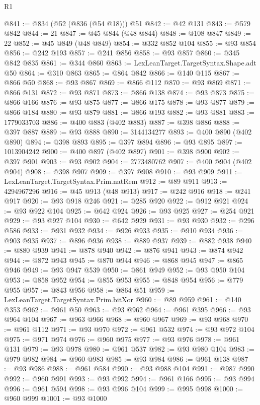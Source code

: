 \begin{lexlean}{R1}
\begin{coremodule}
@841 := @834 (@52 (@836 (@54 @18))) @51
@842 := @42 @131
@843 := @579 @842
@844 := 21
@847 := @45 @844 (@48 @844)
@848 := @108 @847
@849 := 22
@852 := @45 @849 (@48 @849)
@854 := @332 @852 @104
@855 := @93 @854
@856 := @242 @193
@857 := @241 @856
@858 := @93 @857
@860 := @345 @842 @835
@861 := @344 @860
@863 := LexLeanTarget.TargetSyntax.Shape.adt @50
@864 := @310 @863
@865 := @864 @842
@866 := @140 @115
@867 := @866 @50
@868 := @93 @867
@869 := @866 @112
@870 := @93 @869
@871 := @866 @131
@872 := @93 @871
@873 := @866 @138
@874 := @93 @873
@875 := @866 @166
@876 := @93 @875
@877 := @866 @175
@878 := @93 @877
@879 := @866 @184
@880 := @93 @879
@881 := @866 @193
@882 := @93 @881
@883 := 1779033703
@886 := @400 @883 (@402 @883)
@887 := @398 @886
@888 := @397 @887
@889 := @93 @888
@890 := 3144134277
@893 := @400 @890 (@402 @890)
@894 := @398 @893
@895 := @397 @894
@896 := @93 @895
@897 := 1013904242
@900 := @400 @897 (@402 @897)
@901 := @398 @900
@902 := @397 @901
@903 := @93 @902
@904 := 2773480762
@907 := @400 @904 (@402 @904)
@908 := @398 @907
@909 := @397 @908
@910 := @93 @909
@911 := LexLeanTarget.TargetSyntax.Prim.natRem
@912 := @89 @911
@913 := 4294967296
@916 := @45 @913 (@48 @913)
@917 := @242 @916
@918 := @241 @917
@920 := @93 @918 @246
@921 := @285 @920
@922 := @912 @921
@924 := @93 @922 @104
@925 := @642 @924
@926 := @93 @925
@927 := @254 @921
@929 := @93 @927 @104
@930 := @642 @929
@931 := @93 @930
@932 := @296 @586
@933 := @931 @932
@934 := @926 @933
@935 := @910 @934
@936 := @903 @935
@937 := @896 @936
@938 := @889 @937
@939 := @882 @938
@940 := @880 @939
@941 := @878 @940
@942 := @876 @941
@943 := @874 @942
@944 := @872 @943
@945 := @870 @944
@946 := @868 @945
@947 := @865 @946
@949 := @93 @947 @539
@950 := @861 @949
@952 := @93 @950 @104
@953 := @858 @952
@954 := @855 @953
@955 := @848 @954
@956 := @779 @955
@957 := @843 @956
@958 := @864 @51
@959 := LexLeanTarget.TargetSyntax.Prim.bitXor
@960 := @89 @959
@961 := @140 @353
@962 := @961 @50
@963 := @93 @962
@964 := @961 @395
@966 := @93 @964 @104
@967 := @963 @966
@968 := @960 @967
@969 := @93 @968
@970 := @961 @112
@971 := @93 @970
@972 := @961 @532
@974 := @93 @972 @104
@975 := @971 @974
@976 := @960 @975
@977 := @93 @976
@978 := @961 @131
@979 := @93 @978
@980 := @961 @537
@982 := @93 @980 @104
@983 := @979 @982
@984 := @960 @983
@985 := @93 @984
@986 := @961 @138
@987 := @93 @986
@988 := @961 @584
@990 := @93 @988 @104
@991 := @987 @990
@992 := @960 @991
@993 := @93 @992
@994 := @961 @166
@995 := @93 @994
@996 := @961 @594
@998 := @93 @996 @104
@999 := @995 @998
@1000 := @960 @999
@1001 := @93 @1000

\end{coremodule}
\end{lexlean}
